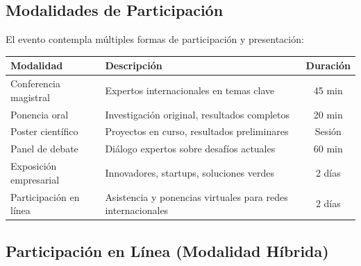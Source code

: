 \documentclass[12pt,a4paper]{article}
\begin{document}
\subsection{Modalidades de Participación}

El evento contempla múltiples formas de participación y presentación:

\begin{table}[H]
\centering
\begin{tabular}{|l|p{10cm}|c|}
\hline
\rowcolor{verdeclaro}
\textbf{Modalidad} & \textbf{Descripción} & \textbf{Duración} \\
\hline
Conferencia magistral & Expertos internacionales en temas clave & 45 min \\
\hline
Ponencia oral & Investigación original, resultados completos & 20 min \\
\hline
Poster científico & Proyectos en curso, resultados preliminares & Sesión \\
\hline
Panel de debate & Diálogo expertos sobre desafíos actuales & 60 min \\
\hline
Exposición empresarial & Innovadores, startups, soluciones verdes & 2 días \\
\hline
Participación en línea & Asistencia y ponencias virtuales para redes internacionales & 2 días \\
\hline
\end{tabular}
\end{table}

\subsection{Participación en Línea (Modalidad Híbrida)}
\end{document}

